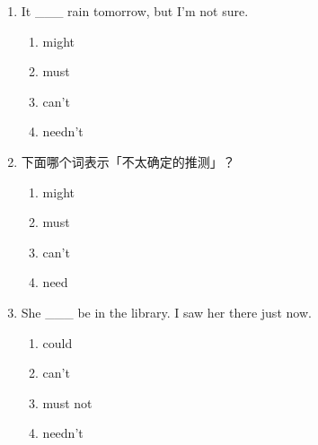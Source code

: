 \documentclass[11pt,a4paper]{ctexart}
\begin{document}
\begin{enumerate}[leftmargin=*,itemsep=4pt]
\begin{enumerate}[label=\Alph*.,leftmargin=2em,itemsep=1pt,topsep=2pt]
\item 更肯定
\item 完全否定
\end{enumerate}
\item It \_\_\_ rain tomorrow, but I’m not sure.
\begin{enumerate}[label=\Alph*.,leftmargin=2em,itemsep=1pt,topsep=2pt]
\item might
\item must
\item can’t
\item needn’t
\end{enumerate}
\item 下面哪个词表示「不太确定的推测」？
\begin{enumerate}[label=\Alph*.,leftmargin=2em,itemsep=1pt,topsep=2pt]
\item might
\item must
\item can’t
\item need
\end{enumerate}
\item She \_\_\_ be in the library. I saw her there just now.
\begin{enumerate}[label=\Alph*.,leftmargin=2em,itemsep=1pt,topsep=2pt]
\item could
\item can’t
\item must not
\item needn’t
\end{enumerate}
\end{enumerate}
\end{document}
